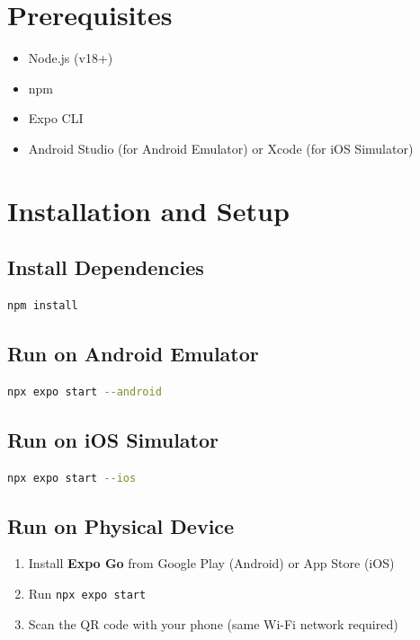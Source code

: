 \documentclass[12pt,a4paper]{article}
\begin{document}
\section{Prerequisites}

\begin{itemize}
    \item Node.js (v18+)
    \item npm
    \item Expo CLI
    \item Android Studio (for Android Emulator) or Xcode (for iOS Simulator)
\end{itemize}

\section{Installation and Setup}

\subsection{Install Dependencies}

\begin{lstlisting}[language=bash]
npm install
\end{lstlisting}

\subsection{Run on Android Emulator}

\begin{lstlisting}[language=bash]
npx expo start --android
\end{lstlisting}

\subsection{Run on iOS Simulator}

\begin{lstlisting}[language=bash]
npx expo start --ios
\end{lstlisting}

\subsection{Run on Physical Device}

\begin{enumerate}
    \item Install \textbf{Expo Go} from Google Play (Android) or App Store (iOS)
    \item Run \texttt{npx expo start}
    \item Scan the QR code with your phone (same Wi-Fi network required)
\end{enumerate}
\end{document}
